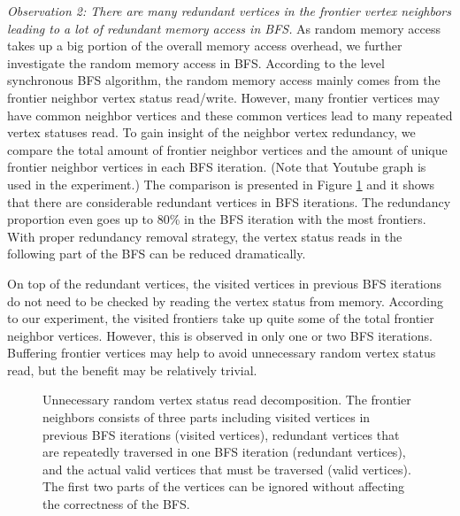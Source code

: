 \textit{Observation 2: There are many redundant vertices in the 
frontier vertex neighbors leading to a lot of redundant memory access in BFS.} 
As random memory access takes up a big portion of the overall memory 
access overhead, we further investigate the random memory access in BFS. 
According to the level synchronous BFS algorithm, the random memory access mainly comes 
from the frontier neighbor vertex status read/write. 
However, many frontier vertices may have common neighbor vertices and these common 
vertices lead to many repeated vertex statuses read. To gain insight of the neighbor 
vertex redundancy, we compare the total amount of frontier 
neighbor vertices and the amount of unique frontier neighbor vertices in each BFS iteration.
(Note that Youtube graph is used in the experiment.) 
The comparison is presented in Figure \ref{fig:repeat-neighbor} and it shows 
that there are considerable redundant vertices in BFS iterations. 
The redundancy proportion even goes up to 80\% in the BFS iteration with the most frontiers. 
With proper redundancy removal strategy, the vertex status reads in the following 
part of the BFS can be reduced dramatically.

On top of the redundant vertices, the visited vertices in previous 
BFS iterations do not need to be checked by reading the vertex status 
from memory. According to our experiment, the visited frontiers 
take up quite some of the total frontier neighbor vertices. However, this is 
observed in only one or two BFS iterations. Buffering 
frontier vertices may help to avoid unnecessary random vertex status read, 
but the benefit may be relatively trivial.  

\begin{figure}
	\caption{Unnecessary random vertex status read decomposition. 
		The frontier neighbors consists of three parts including visited vertices 
		in previous BFS iterations (visited vertices), 
		redundant vertices that are repeatedly traversed in one BFS iteration (redundant vertices), 
		and the actual valid vertices that must be traversed (valid vertices). 
		The first two parts of the vertices can be ignored without 
	affecting the correctness of the BFS.}
	\label{fig:repeat-neighbor}
	\vspace{-1.2em}
\end{figure}

